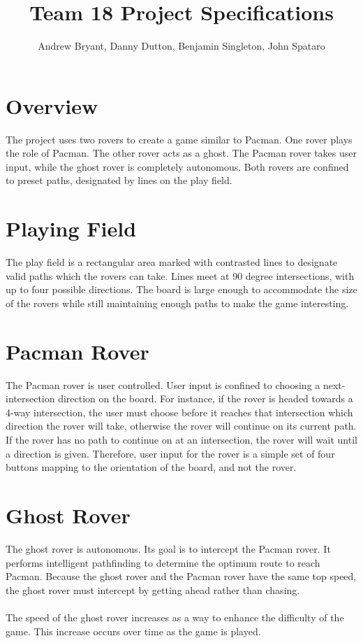 \documentclass[12pt,letterpaper]{article}
\title{Team 18 Project Specifications}
\author{Andrew Bryant, Danny Dutton, Benjamin Singleton, John Spataro}
\begin{document}
\maketitle

\section{Overview}
The project uses two rovers to create a game similar to Pacman. One rover plays the role of Pacman. The other rover acts as a ghost. The Pacman rover takes user input, while the ghost rover is completely autonomous. Both rovers are confined to preset paths, designated by lines on the play field. 

\section{Playing Field}
The play field is a rectangular area marked with contrasted lines to designate valid paths which the rovers can take. Lines meet at 90 degree intersections, with up to four possible directions. The board is large enough to accommodate the size of the rovers while still maintaining enough paths to make the game interesting.

\section{Pacman Rover}
The Pacman rover is user controlled. User input is confined to choosing a next-intersection direction on the board. For instance, if the rover is headed towards a 4-way intersection, the user must choose before it reaches that intersection which direction the rover will take, otherwise the rover will continue on its current path. If the rover has no path to continue on at an intersection, the rover will wait until a direction is given. Therefore, user input for the rover is a simple set of four buttons mapping to the orientation of the board, and not the rover.

\section{Ghost Rover}
The ghost rover is autonomous. Its goal is to intercept the Pacman rover. It performs intelligent pathfinding to determine the optimum route to reach Pacman. Because the ghost rover and the Pacman rover have the same top speed, the ghost rover must intercept by getting ahead rather than chasing. 

\paragraph{}
The speed of the ghost rover increases as a way to enhance the difficulty of the game. This increase occurs over time as the game is played.
\end{document}
